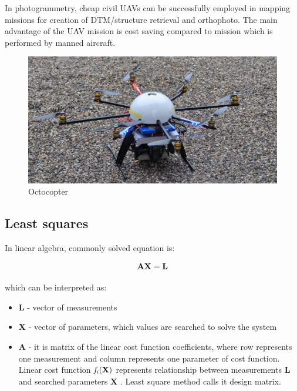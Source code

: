 \documentclass[a4paper,12pt]{article}
\newcommand{\ematr}[1]{
{\bf #1}
}
\newcommand{\evect}[1]{
{\bf #1}
}
\newcommand{\efunc}[1]{
{\it #1}
}
\newcommand{\term}[1]{
{\it #1}
}
\begin{document}
In photogrammetry, cheap civil UAVs can be successfully employed in mapping missions for creation of DTM/structure retrieval and orthophoto.
The main advantage of the UAV mission is cost saving compared to mission which is performed by manned aircraft.

\begin{figure}[h]
    \centering
    \includegraphics[scale=0.8]{figures/octocopter.jpg}
    \caption{Octocopter \cite{boe2013octocopter}}
    \label{fig:sample_figure}
\end{figure}


\subsection{Least squares}
\label{sec:least}


In linear algebra, commonly solved equation is:

\begin{equation}
\label{eq:linear_eq}
\ematr{A}\evect{X} = \evect{L} 
\end{equation} 



which can be interpreted as:
\begin{itemize}
\item \evect{L} - vector of measurements
\item \evect{X} - vector of parameters, which values are searched to solve the system
\item \ematr{A} - it is matrix of the linear cost function  coefficients,  where row represents one measurement 
		  and column represents one parameter of cost function. Linear cost function $\efunc{f_{i}(\evect{X})}$
		  represents relationship between measurements \evect{L} and searched parameters \evect{X}. 
		  Least square method calls it design matrix. 
\end{itemize}
\end{document}
